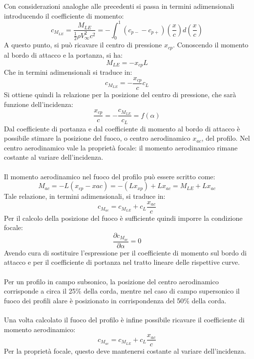 Con considerazioni analoghe alle precedenti si passa in termini adimensionali introducendo il coefficiente di momento:
\begin{equation*}
    c_{M_{LE}} = \frac{M_{LE}}{\frac12 \rho V_\infty^2 c^2} = -\int_0^1 (c_{p-}-c_{p+}) \left( \frac xc \right) d\left( \frac xc \right)
\end{equation*}
A questo punto, si può ricavare il centro di pressione $x_{cp}$. Conoscendo il momento al bordo di attacco e la portanza, si ha:
\begin{equation*}
    M_{LE} = -x_{cp} L
\end{equation*}
Che in termini adimensionali si traduce in:
\begin{equation*}
    c_{M_{LE}} = - \frac{x_{cp}}c c_L
\end{equation*}
Si ottiene quindi la relazione per la posizione del centro di pressione, che sarà funzione dell'incidenza:
\begin{equation*}
    \frac{x_{cp}}c = -\frac{c_{M_{LE}}}{c_L} = f(\alpha)
\end{equation*}
Dal coefficiente di portanza e dal coefficiente di momento al bordo di attacco è possibile stimare la posizione del fuoco, o centro aerodinamico $x_{ac}$, del profilo. Nel centro aerodinamico vale la proprietà focale: il momento aerodinamico rimane costante al variare dell'incidenza.\\\\
Il momento aerodinamico nel fuoco del profilo può essere scritto come:
\begin{equation*}
    M_{ac} = - L (x_{cp}-x{ac}) = -(Lx_{xp}) + Lx_{ac} = M_{LE} + Lx_{ac}
\end{equation*}
Tale relazione, in termini adimensionali, si traduce in:
\begin{equation*}
    c_{M_{ac}} = c_{M_{LE}} + c_L \frac{x_{ac}}c
\end{equation*}
Per il calcolo della posizione del fuoco è sufficiente quindi imporre la condizione focale:
\begin{equation*}
    \frac{\partial c_{M_{ac}}}{\partial \alpha} = 0
\end{equation*}
Avendo cura di sostituire l'espressione per il coefficiente di momento sul bordo di attacco e per il coefficiente di portanza nel tratto lineare delle rispettive curve.\\\\
Per un profilo in campo subsonico, la posizione del centro aerodinamico corrisponde a circa il 25\% della corda, mentre nel caso di campo supersonico il fuoco dei profili alare è posizionato in corrispondenza del 50\% della corda.\\\\
Una volta calcolato il fuoco del profilo è infine possibile ricavare il coefficiente di momento aerodinamico:
\begin{equation*}
    c_{M_{ac}} = c_{M_{LE}} + c_L \frac{x_{ac}}c
\end{equation*}
Per la proprietà focale, questo deve mantenersi costante al variare dell'incidenza.

